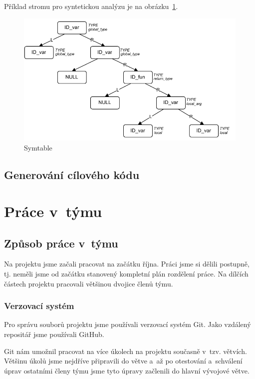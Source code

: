\documentclass[a4paper, 12pt]{article}
\begin{document}
	Příklad stromu pro syntetickou analýzu je na obrázku~\ref{figure:symtable}.

	\begin{figure}[!ht]
		\centering
		\includegraphics[width=0.8\linewidth]{symtable.pdf}
		\caption{Symtable}
		\label{figure:symtable}
	\end{figure}


	\subsection{Generování cílového kódu}


	\section{Práce v~týmu}

	\subsection{Způsob práce v~týmu}

	Na projektu jsme začali pracovat na začátku října. Práci jsme si dělili postupně, tj. neměli jsme od začátku
	stanovený kompletní plán rozdělení práce. Na dílčích částech projektu pracovali většinou
	dvojice členů týmu.

	\subsubsection{Verzovací systém}

	Pro správu souborů projektu jsme používali verzovací systém Git. Jako vzdálený repositář jsme používali \mbox{GitHub}.

	Git nám umožnil pracovat na více úkolech na projektu současně v~tzv. větvích. Většinu úkolů jsme nejdříve připravili
	do větve a~až po otestování a~schválení úprav ostatními členy týmu jsme tyto úpravy začlenili do hlavní
	vývojové větve.
\end{document}
